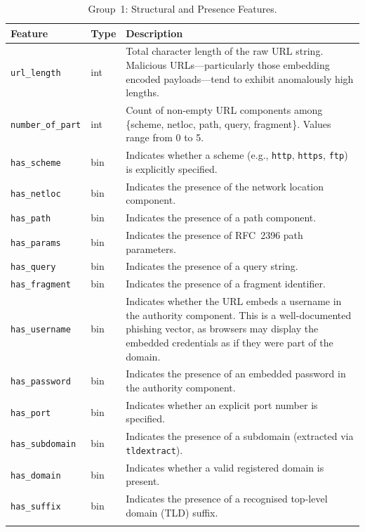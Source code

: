 \documentclass[a4paper,12pt]{article}
\begin{document}
\begin{longtable}{p{4.5cm}p{1.5cm}p{7cm}}
\toprule
\textbf{Feature} & \textbf{Type} & \textbf{Description} \\
\midrule
\endhead
\texttt{url\_length}       & int   & Total character length of the raw URL string. Malicious URLs---particularly those embedding encoded payloads---tend to exhibit anomalously high lengths. \\
\texttt{number\_of\_part}  & int   & Count of non-empty URL components among \{scheme, netloc, path, query, fragment\}. Values range from 0 to 5. \\
\texttt{has\_scheme}       & bin   & Indicates whether a scheme (e.g., \texttt{http}, \texttt{https}, \texttt{ftp}) is explicitly specified. \\
\texttt{has\_netloc}       & bin   & Indicates the presence of the network location component. \\
\texttt{has\_path}         & bin   & Indicates the presence of a path component. \\
\texttt{has\_params}       & bin   & Indicates the presence of RFC~2396 path parameters. \\
\texttt{has\_query}        & bin   & Indicates the presence of a query string. \\
\texttt{has\_fragment}     & bin   & Indicates the presence of a fragment identifier. \\
\texttt{has\_username}     & bin   & Indicates whether the URL embeds a username in the authority component. This is a well-documented phishing vector, as browsers may display the embedded credentials as if they were part of the domain. \\
\texttt{has\_password}     & bin   & Indicates the presence of an embedded password in the authority component. \\
\texttt{has\_port}         & bin   & Indicates whether an explicit port number is specified. \\
\texttt{has\_subdomain}    & bin   & Indicates the presence of a subdomain (extracted via \texttt{tldextract}). \\
\texttt{has\_domain}       & bin   & Indicates whether a valid registered domain is present. \\
\texttt{has\_suffix}       & bin   & Indicates the presence of a recognised top-level domain (TLD) suffix. \\
\bottomrule
\caption{Group~1: Structural and Presence Features.}
\label{tab:structural}
\end{longtable}
\end{document}
